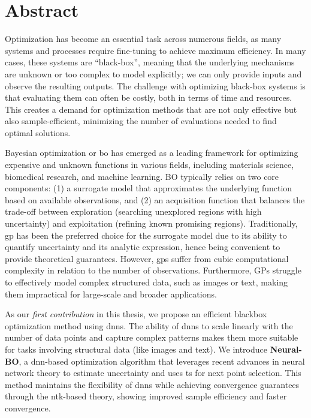 \chapter*{Abstract} %
\label{chap:abstract}
Optimization has become an essential task across numerous fields, as many systems and processes require fine-tuning to achieve maximum efficiency. In many cases, these systems are ``black-box'', meaning that the underlying mechanisms are unknown or too complex to model explicitly; we can only provide inputs and observe the resulting outputs. The challenge with optimizing black-box systems is that evaluating them can often be costly, both in terms of time and resources. This creates a demand for optimization methods that are not only effective but also sample-efficient, minimizing the number of evaluations needed to find optimal solutions. 


Bayesian optimization or \ac{bo} has emerged as a leading framework for optimizing expensive and unknown functions in various fields, including materials science, biomedical research, and machine learning. BO typically relies on two core components: (1) a surrogate model that approximates the underlying function based on available observations, and (2) an acquisition function that balances the trade-off between exploration (searching unexplored regions with high uncertainty) and exploitation (refining known promising regions). Traditionally, \ac{gp} has been the preferred choice for the surrogate model due to its ability to quantify uncertainty and its analytic expression, hence being convenient to provide theoretical guarantees. However, \acp{gp} suffer from cubic computational complexity in relation to the number of observations. Furthermore, GPs struggle to effectively model complex structured data, such as images or text,  making them impractical for large-scale and broader applications.


As our \emph{first contribution} in this thesis, we propose an efficient blackbox optimization method using \acp{dnn}. The ability of \acp{dnn} to scale linearly with the number of data points and capture complex patterns makes them more suitable for tasks involving structural data (like images and text). We introduce \textbf{Neural-BO}, a \ac{dnn}-based optimization algorithm that leverages recent advances in neural network theory to estimate uncertainty and uses \ac{ts} for next point selection. This method maintains the flexibility of \acp{dnn} while achieving convergence guarantees through the \ac{ntk}-based theory, showing improved sample efficiency and faster convergence.   


